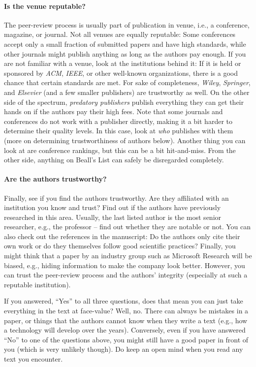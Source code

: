 \documentclass[a4]{article}
\begin{document}
\paragraph{Is the venue reputable?}
The peer-review process is usually part of publication in venue, i.e., a conference, magazine, or journal.
Not all venues are equally reputable:
Some conferences accept only a small fraction of submitted papers and have high standards, while other journals might publish anything as long as the authors pay enough.
If you are not familiar with a venue, look at the institutions behind it:
If it is held or sponsored by \emph{ACM}, \emph{IEEE}, or other well-known organizations, there is a good chance that certain standards are met.
For sake of completeness, \emph{Wiley}, \emph{Springer}, and \emph{Elsevier} (and a few smaller publishers) are trustworthy as well.
On the other side of the spectrum, \emph{predatory publishers} publish everything they can get their hands on if the authors pay their high fees.
Note that some journals and conferences do not work with a publisher directly, making it a bit harder to determine their quality levels.
In this case, look at \emph{who} publishes with them (more on determining trustworthiness of authors below).
Another thing you can look at are conference rankings, but this can be a bit hit-and-miss.
From the other side, anything on Beall's List can safely be disregarded completely.

\paragraph{Are the authors trustworthy?}
Finally, see if you find the authors trustworthy.
Are they affiliated with an institution you know and trust?
Find out if the authors have previously researched in this area.
Usually, the last listed author is the most senior researcher, e.g., the professor -- find out whether they are notable or not.
You can also check out the references in the manuscript:
Do the authors only cite their own work or do they themselves follow good scientific practices?
Finally, you might think that a paper by an industry group such as Microsoft Research will be biased, e.g., hiding information to make the company look better.
However, you can trust the peer-review process and the authors' integrity (especially at such a reputable institution).

If you answered, ``Yes'' to all three questions, does that mean you can just take everything in the text at face-value?
Well, no.
There can always be mistakes in a paper, or things that the authors cannot know when they write a text (e.g., how a technology will develop over the years).
Conversely, even if you have answered ``No'' to one of the questions above, you might still have a good paper in front of you (which is very unlikely though).
Do keep an open mind when you read any text you encounter.
\end{document}
